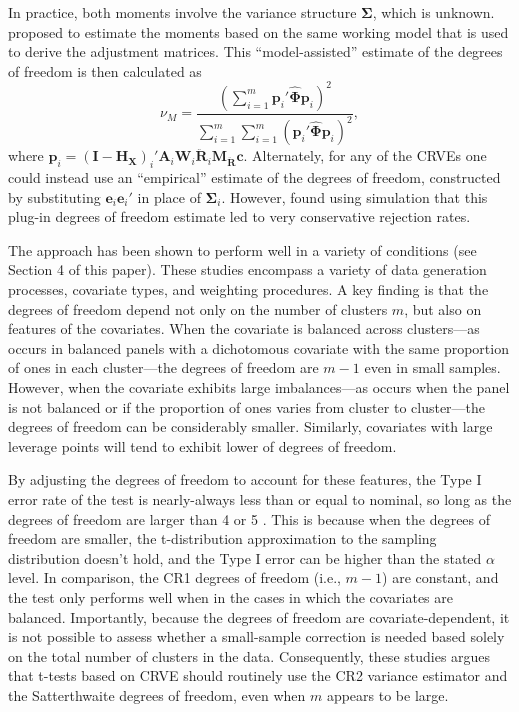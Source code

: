 \documentclass[12pt]{article}\usepackage[]{graphicx}\usepackage[]{color}
\newcommand{\bm}{\mathbf}
\newcommand{\bs}{\boldsymbol}
\begin{document}
In practice, both moments involve the variance structure $\bs\Sigma$, which is unknown. 
\citet{Bell2002bias} proposed to estimate the moments based on the same working model that is used to derive the adjustment matrices. 
This ``model-assisted'' estimate of the degrees of freedom is then calculated as 
\begin{equation}
\label{eq:nu_model}
\nu_{M} = \frac{\left(\sum_{i=1}^m \bm{p}_i' \hat{\bs\Phi} \bm{p}_i\right)^2}{\sum_{i=1}^m \sum_{i=1}^m \left(\bm{p}_i' \hat{\bs\Phi} \bm{p}_i\right)^2},
\end{equation}
where $\bm{p}_i = \left(\bm{I} - \bm{H_X}\right)_i'\bm{A}_i \bm{W}_i\bm{\ddot{R}}_i\bm{M_{\ddot{R}}} \bm{c}$.
Alternately, for any of the CRVEs one could instead use an ``empirical'' estimate of the degrees of freedom, constructed by substituting $\bm{e}_i \bm{e}_i'$ in place of $\bs\Sigma_i$. 
However, \citet{Bell2002bias} found using simulation that this plug-in degrees of freedom estimate led to very conservative rejection rates. 

The \citet{Bell2002bias} approach has been shown to perform well in a variety of conditions (see Section 4 of this paper). 
These studies encompass a variety of data generation processes, covariate types, and weighting procedures. 
A key finding is that the degrees of freedom depend not only on the number of clusters $m$, but also on features of the covariates. 
When the covariate is balanced across clusters---as occurs in balanced panels with a dichotomous covariate with the same proportion of ones in each cluster---the degrees of freedom are $m - 1$ even in small samples. 
However, when the covariate exhibits large imbalances---as occurs when the panel is not balanced or if the proportion of ones varies from cluster to cluster---the degrees of freedom can be considerably smaller. 
Similarly, covariates with large leverage points will tend to exhibit lower of degrees of freedom. 


By adjusting the degrees of freedom to account for these features, the Type I error rate of the test is nearly-always less than or equal to nominal, so long as the degrees of freedom are larger than 4 or 5 \citep{Bell2002bias, Tipton2015small-t}.
This is because when the degrees of freedom are smaller, the t-distribution approximation to the sampling distribution doesn't hold, and the Type I error can be higher than the stated $\alpha$ level.
In comparison, the CR1 degrees of freedom (i.e., $m - 1$) are constant, and the test only performs well when in the cases in which the covariates are balanced.
Importantly, because the degrees of freedom are covariate-dependent, it is not possible to assess whether a small-sample correction is needed based solely on the total number of clusters in the data. 
Consequently, these studies argues that t-tests based on CRVE should routinely use the CR2 variance estimator and the Satterthwaite degrees of freedom, even when $m$ appears to be large.
\end{document}
